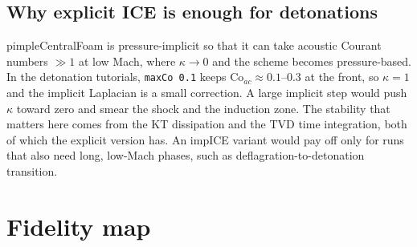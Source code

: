 \documentclass[11pt]{article}
\newcommand{\code}[1]{\texttt{\small #1}}
\begin{document}
\subsection{Why explicit ICE is enough for detonations}\label{sec:why-explicit}
pimpleCentralFoam is pressure-implicit so that it can take acoustic Courant numbers
$\gg 1$ at low Mach, where $\kappa\to 0$ and the scheme becomes pressure-based. In the
detonation tutorials, \code{maxCo 0.1} keeps $\mathrm{Co}_{ac}\approx 0.1$--$0.3$ at the front,
so $\kappa=1$ and the implicit Laplacian is a small correction. A large implicit step would
push $\kappa$ toward zero and smear the shock and the induction zone. The stability that
matters here comes from the KT dissipation and the TVD time integration, both of which the
explicit version has. An impICE variant would pay off only for runs that also need long,
low-Mach phases, such as deflagration-to-detonation transition.

\clearpage
\section{Fidelity map}
\end{document}
